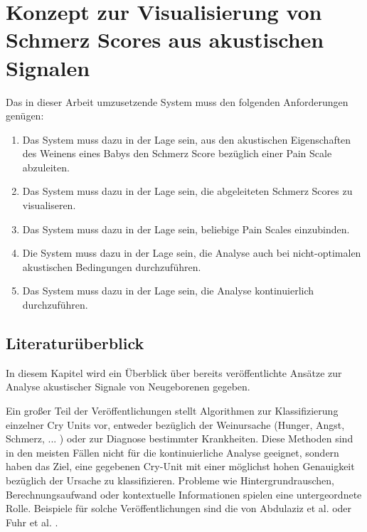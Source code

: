 \chapter{Konzept zur Visualisierung von Schmerz Scores aus akustischen Signalen}

Das in dieser Arbeit umzusetzende System muss den folgenden Anforderungen genügen:
\begin{enumerate}
	\item Das System muss dazu in der Lage sein, aus den akustischen Eigenschaften des Weinens eines Babys den Schmerz Score bezüglich einer Pain Scale abzuleiten.
	\item Das System muss dazu in der Lage sein, die abgeleiteten Schmerz Scores zu visualiseren.
	\item Das System muss dazu in der Lage sein, beliebige Pain Scales einzubinden. 
	\item Die System muss dazu in der Lage sein,  die Analyse auch bei nicht-optimalen akustischen Bedingungen durchzuführen.
	\item Das System muss dazu in der Lage sein, die Analyse kontinuierlich durchzuführen.
\end{enumerate}

\section{Literaturüberblick}
\label{sec:system_literature}

In diesem Kapitel wird ein Überblick über bereits veröffentlichte Ansätze zur Analyse akustischer Signale von Neugeborenen gegeben.

Ein großer Teil der Veröffentlichungen stellt Algorithmen zur Klassifizierung einzelner Cry Units vor, entweder bezüglich der Weinursache (Hunger, Angst, Schmerz, ... ) oder zur Diagnose bestimmter Krankheiten. Diese Methoden sind in den meisten Fällen nicht für die kontinuierliche Analyse geeignet, sondern haben das Ziel, eine gegebenen Cry-Unit mit einer möglichst hohen Genauigkeit bezüglich der Ursache zu klassifizieren. Probleme wie Hintergrundrauschen, Berechnungsaufwand oder kontextuelle Informationen spielen eine untergeordnete Rolle. Beispiele für solche Veröffentlichungen sind die von Abdulaziz et al. \cite{class_abdulaziz} oder Fuhr et al. \cite{comparisonOfLearning}.

